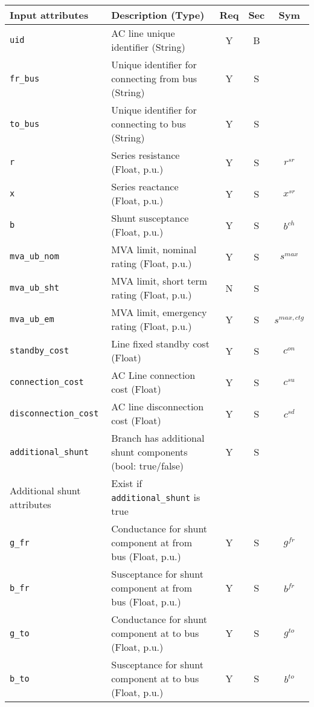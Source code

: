 \documentclass{article}
\begin{document}
\begin{center}
\small
\begin{tabular}{ l | l | c | c | c | }
Input attributes & Description (Type)& Req & Sec & Sym\\
\hline
  {\tt uid} & AC line unique identifier (String)& Y & B &  \\
  {\tt fr\_bus} & Unique identifier for connecting from bus (String)& Y & S & \\
  {\tt to\_bus} & Unique identifier for connecting to bus (String)& Y & S & \\
  {\tt r} & Series resistance (Float, p.u.)& Y & S & $r^{sr}$\\
  {\tt x} & Series reactance  (Float, p.u.)& Y & S & $x^{sr}$\\
  {\tt b} & Shunt susceptance (Float, p.u.)& Y & S & $b^{ch}$\\
  {\tt mva\_ub\_nom} & MVA limit, nominal rating (Float, p.u.)& Y & S & $s^{max}$\\
  {\tt mva\_ub\_sht} & MVA limit, short term rating (Float, p.u.)& N & S & \\
  {\tt mva\_ub\_em} & MVA limit, emergency rating (Float, p.u.)& Y & S & $s^{max,ctg}$\\
  {\tt standby\_cost} & Line fixed standby cost (Float) & Y & S & $c^{on}$\\
  {\tt connection\_cost} &  AC Line connection cost (Float) & Y & S & $c^{su}$\\
  {\tt disconnection\_cost} & AC line disconnection cost (Float) & Y & S & $c^{sd}$\\
  {\tt additional\_shunt} & Branch has additional shunt components (bool: true/false)& Y & S & \\
  \hline
  Additional shunt attributes & Exist if {\tt additional\_shunt} is true &  & & \\
  \hline
  {\tt g\_fr} & Conductance for shunt component at from bus (Float, p.u.)& Y & S & $g^{fr}$\\
  {\tt b\_fr} & Susceptance for shunt component at from bus (Float, p.u.)& Y & S & $b^{fr}$\\
  {\tt g\_to} & Conductance for shunt component at to bus (Float, p.u.)& Y & S & $g^{to}$\\
  {\tt b\_to} & Susceptance for shunt component at to bus (Float, p.u.)& Y & S & $b^{to}$\\
  \hline
\end{tabular}
\end{center}
\end{document}
